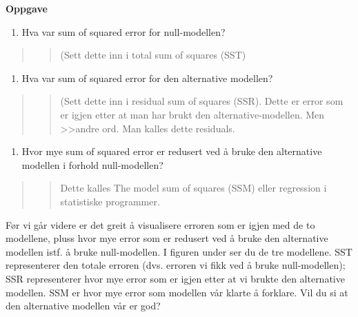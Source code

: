 \documentclass[
]{book}
\providecommand{\tightlist}{%
  \setlength{\itemsep}{0pt}\setlength{\parskip}{0pt}}
\begin{document}
\textbf{Oppgave}

\begin{enumerate}
\def\labelenumi{\alph{enumi}.}
\tightlist
\item
  Hva var sum of squared error for null-modellen?
\end{enumerate}

\begin{quote}
\begin{quote}
(Sett dette inn i total sum of squares (SST)
\end{quote}
\end{quote}

\begin{enumerate}
\def\labelenumi{\alph{enumi}.}
\setcounter{enumi}{1}
\tightlist
\item
  Hva var sum of squared error for den alternative modellen?
\end{enumerate}

\begin{quote}
\begin{quote}
(Sett dette inn i residual sum of squares (SSR). Dette er error som er igjen etter at man har brukt den alternative-modellen. Men \textgreater\textgreater andre ord. Man kalles dette residuals.
\end{quote}
\end{quote}

\begin{enumerate}
\def\labelenumi{\alph{enumi}.}
\setcounter{enumi}{2}
\tightlist
\item
  Hvor mye sum of squared error er redusert ved å bruke den alternative modellen i forhold null-modellen?
\end{enumerate}

\begin{quote}
\begin{quote}
Dette kalles The model sum of squares (SSM) eller regression i statistiske programmer.
\end{quote}
\end{quote}

Før vi går videre er det greit å visualisere erroren som er igjen med de to modellene, pluss hvor mye error som er redusert ved å bruke den alternative modellen istf. å bruke null-modellen. I figuren under ser du de tre modellene. SST representerer den totale erroren (dvs. erroren vi fikk ved å bruke null-modellen); SSR representerer hvor mye error som er igjen etter at vi brukte den alternative modellen. SSM er hvor mye error som modellen vår klarte å forklare. Vil du si at den alternative modellen vår er god?
\end{document}
